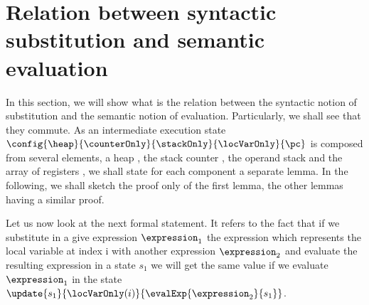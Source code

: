 \newtheorem{substHeap}{Lemma}[section]
\newtheorem{newHeap}[substHeap]{Lemma}
\newtheorem{substStack}[substHeap]{Lemma}
\newtheorem{substCntr}[substHeap]{Lemma}
\newtheorem{substLv}[substHeap]{Lemma}
\newtheorem{substRet}[substHeap]{Lemma}


\newtheorem{valid}{Definition}[section]

\section{Relation between syntactic substitution and semantic evaluation}\label{substProp}

In this section, we will show what is the relation between the syntactic notion
of substitution and the semantic notion of evaluation. Particularly, we shall see that they commute.
As an intermediate execution state $ \config{\heap}{\counterOnly}{ \stackOnly }{\locVarOnly}{\pc } $ 
is composed from several elements, a heap \heap{}, the stack counter \counterOnly, the operand stack \stackOnly{} 
and the array of registers \locVarOnly, we shall state for each component a separate lemma.
In the following, we shall sketch the proof only of the first lemma, the other lemmas having a similar proof. 

Let us now look at the next formal statement.
It refers to the fact that if we substitute in a give expression $\expression_1$ 
the expression   which represents the local variable at index i
 with another expression $\expression_2$ and evaluate the resulting expression in a state $s_1$
 we will get the same value if we evaluate   $\expression_1$  in the state 
$\update{s_1}{\locVarOnly(i) }{ \evalExp{ \expression_2 }{s_1}  }$.


